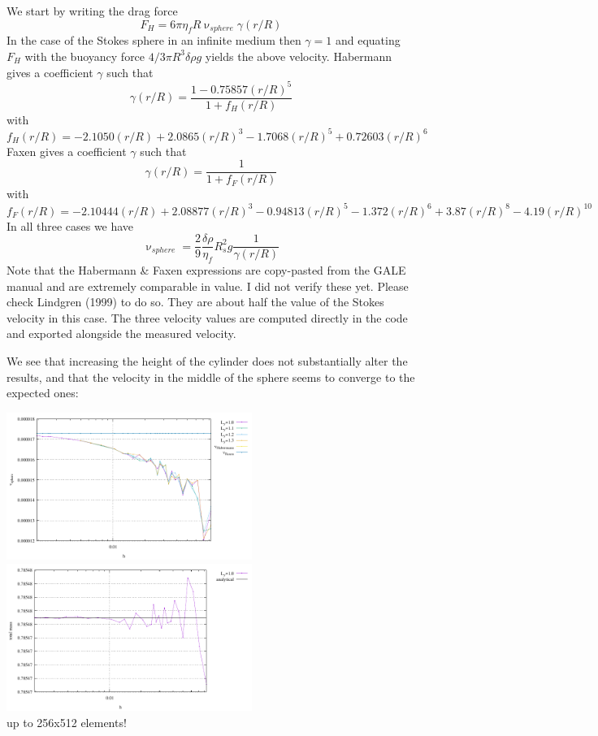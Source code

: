 We start by writing the drag force
\[
F_H = 6 \pi \eta_f R \upnu_{sphere}  \gamma(r/R) 
\]
In the case of the Stokes sphere in an infinite medium then $\gamma =1$ and equating
$F_H$ with the buoyancy force $4/3 \pi R^3 \delta\rho g$ yields the above velocity.
Habermann gives a coefficient $\gamma$ such that 
\[
\gamma(r/R)  = \frac{1-0.75857 (r/R)^5}{1+f_H(r/R)}
\]
with 
\[
f_H(r/R) = -2.1050(r/R)+ 2.0865(r/R)^3-  1.7068(r/R)^5 + 0.72603(r/R)^6 
\]
Faxen gives a coefficient $\gamma$ such that 
\[
\gamma(r/R) = \frac{1}{1 + f_F(r/R)} 
\]
with 
\[
f_F(r/R) = -2.10444(r/R) + 2.08877(r/R)^3 - 0.94813(r/R)^5 -1.372(r/R)^6 + 3.87(r/R)^8 - 4.19(r/R)^{10}
\]
In all three cases we have 
\[
\upnu_{sphere} = \frac{2}{9} \frac{\delta \rho}{\eta_f} R_s^2 g \frac{1}{\gamma(r/R)}
\]
Note that the Habermann \& Faxen expressions are copy-pasted from the GALE manual and 
are extremely comparable in value. I did not verify these yet. 
Please check Lindgren (1999) \cite{lind99} to do so. They are about half the value of the Stokes velocity
in this case. The three velocity values are computed directly in the code and exported alongside
the measured velocity.

We see that increasing the height of the cylinder does not substantially alter the results, and that 
the velocity in the middle of the sphere seems to converge to the expected ones:
\begin{center}
\includegraphics[width=8cm]{python_codes/fieldstone_91/results/vc.pdf}
\includegraphics[width=8cm]{python_codes/fieldstone_91/results/mass.pdf}\\
{\captionfont up to 256x512 elements!}
\end{center}



